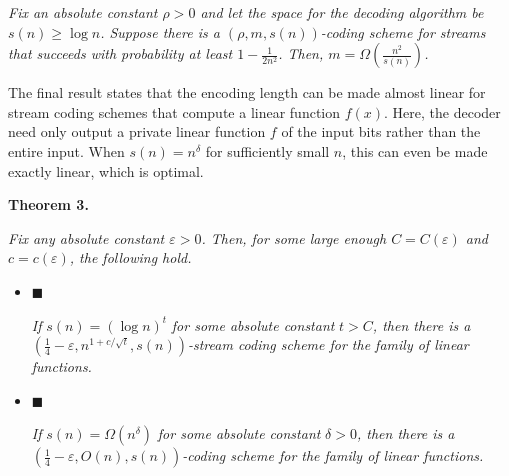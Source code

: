 \documentclass[10pt,a4paper]{article}
\begin{document}
\emph{Fix an absolute constant $\rho>0$ and let the space for the decoding algorithm be $s(n)\geq\log n$. Suppose there is a $\left(\rho,m,s(n)\right)$-coding scheme for streams that succeeds with probability at least $1-\frac{1}{2n^{2}}$. Then, $m=\Omega\left(\frac{n^{2}}{s(n)}\right)$.}\par







The final result states that the encoding length can be made almost linear for stream coding schemes that compute a linear function $f(x)$. Here, the decoder need only output a private linear function $f$ of the input bits rather than the entire input.
When $s(n)=n^{\delta}$ for sufficiently small $n$, this can even be made exactly linear, which is optimal.\par





\par\medskip\noindent\textbf{
\textbf{Theorem 3}\textbf{.}
}\par



\emph{Fix any absolute constant $\varepsilon>0$. Then, for some large enough
$C=C(\varepsilon)$ and $c=c(\varepsilon)$, the following hold.}\par


\begin{itemize}


\item[] 
$\blacksquare$ 


\emph{If }$s(n)=(\log n)^{t}$\emph{ for some absolute constant }$t>C$\emph{, then there is a }$\left(\frac{1}{4}-\varepsilon,n^{1+c/\sqrt{t}},s(n)\right)$\emph{-stream coding scheme for the family of linear functions.}\par





\item[] 
$\blacksquare$ 


\emph{If }$s(n)=\Omega(n^{\delta})$\emph{ for some absolute constant }$\delta>0$\emph{, then there is a }$\left(\frac{1}{4}-\varepsilon,O(n),s(n)\right)$\emph{-coding scheme for the family of linear functions.}\par





\end{itemize}
\end{document}
